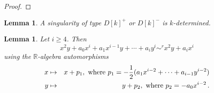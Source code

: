 \documentclass{amsproc}
\begin{document}
\begin{proof}
\end{proof}
\newtheorem{kDeterminacyD[k]k>4}[kjet]{Lemma}
\begin{kDeterminacyD[k]k>4}\label{kDeterminacyD[k]k>4}
A singularity of type $D[k]^+$ or $D[k]^-$ is $k$-determined.
\end{kDeterminacyD[k]k>4}
\newtheorem{transformationD[k]}[kjet]{Lemma}
\begin{transformationD[k]}\label{transformationD[k]}
Let $i\ge 4$. Then
\[x^2y+a_0x^i+a_1x^{i-1}y+\cdots+a_iy^i\sim^rx^2y+a_ix^i\]
using the $\mathbb R$-algebra automorphisms
\begin{eqnarray*}
x&\mapsto&x+p_1,\textnormal{ where } p_1=-\frac{1}{2}(a_1x^{i-2}+\cdots+a_{i-1}y^{i-2})\\
y&\mapsto&y+p_2,\textnormal{ where } p_2=-a_0x^{i-2} \,.
\end{eqnarray*}
\end{transformationD[k]}
\end{document}
